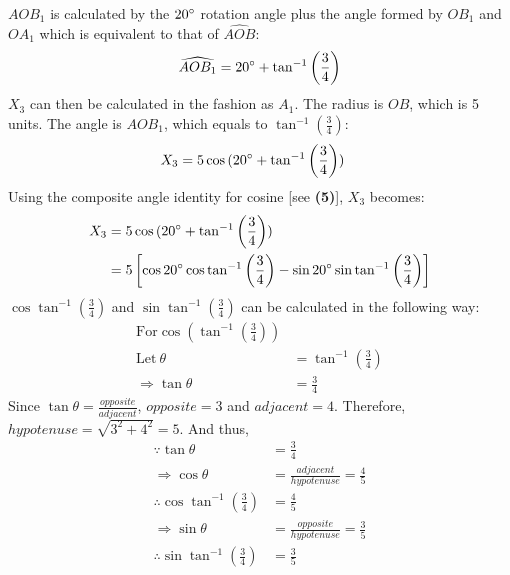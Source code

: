 \documentclass{article}
\begin{document}
            $AOB_1$ is calculated by the $20\degree$ rotation angle plus the angle formed by $OB_1$ and $OA_1$ which is equivalent to that of $\widehat{AOB}$:
            \begin{equation*}
                \widehat{AOB_1} = 20\degree + \tan^{-1}{\left(\frac{3}{4}\right)}
            \end{equation*}
            $X_3$ can then be calculated in the fashion as $A_1$. The radius is $OB$, which is 5 units. The angle is $AOB_1$, which equals to $\tan^{-1}{\left(\frac{3}{4}\right)}$:
            \begin{align*}
                X_3 &= 5\cos{(20\degree + \tan^{-1}{\left(\frac{3}{4}\right))}}
            \end{align*}
            Using the composite angle identity for cosine [see \textbf{(5)}], $X_3$ becomes:
            \begin{align*}
                X_3 &= 5\cos{(20\degree + \tan^{-1}{\left(\frac{3}{4}\right)})} \\
                &= 5\left[\cos{20\degree}\cos{\tan^{-1}{\left(\frac{3}{4}\right)}} - \sin{20\degree}\sin{\tan^{-1}{\left(\frac{3}{4}\right)}}\right]
            \end{align*}
            $\cos{\tan^{-1}{\left(\frac{3}{4}\right)}}$ and $\sin{\tan^{-1}{\left(\frac{3}{4}\right)}}$ can be calculated in the following way:
            \begin{align*}
                \mathrm{For} \cos{\left( \tan^{-1}{\left(\frac{3}{4}\right)}\right) } \\
                \mathrm{Let \ } \theta &= \tan^{-1}{\left(\frac{3}{4}\right)} \\
                \Rightarrow \tan{\theta} &= \frac{3}{4}
            \end{align*}
            Since $\tan{\theta} = \frac{opposite}{adjacent}$, $opposite = 3$ and $adjacent = 4$. Therefore, $hypotenuse = \sqrt{3^2 + 4^2} = 5$. And thus,
            \begin{align*}
                \because \tan{\theta} &= \frac{3}{4} \\
                \Rightarrow \cos{\theta} &= \frac{adjacent}{hypotenuse} = \frac{4}{5} \\
                \therefore \cos{\tan^{-1}{\left(\frac{3}{4}\right)}} &= \frac{4}{5} \\
                \Rightarrow \sin{\theta} &= \frac{opposite}{hypotenuse} = \frac{3}{5} \\
                \therefore \sin{\tan^{-1}{\left(\frac{3}{4}\right)}} &= \frac{3}{5}
            \end{align*}
\end{document}
